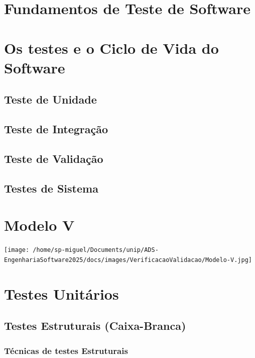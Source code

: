 \documentclass[
]{book}
\begin{document}
\section{Fundamentos de Teste de Software}\label{fundamentos-de-teste-de-software}

\section{Os testes e o Ciclo de Vida do Software}\label{os-testes-e-o-ciclo-de-vida-do-software}

\subsection{Teste de Unidade}\label{teste-de-unidade}

\subsection{Teste de Integração}\label{teste-de-integrauxe7uxe3o}

\subsection{Teste de Validação}\label{teste-de-validauxe7uxe3o}

\subsection{Testes de Sistema}\label{testes-de-sistema}

\section{Modelo V}\label{modelo-v}

\texttt{[image: /home/sp-miguel/Documents/unip/ADS-EngenhariaSoftware2025/docs/images/VerificacaoValidacao/Modelo-V.jpg]}

\section{Testes Unitários}\label{testes-unituxe1rios}

\subsection{Testes Estruturais (Caixa-Branca)}\label{testes-estruturais-caixa-branca}

\subsubsection{Técnicas de testes Estruturais}\label{tuxe9cnicas-de-testes-estruturais}
\end{document}
